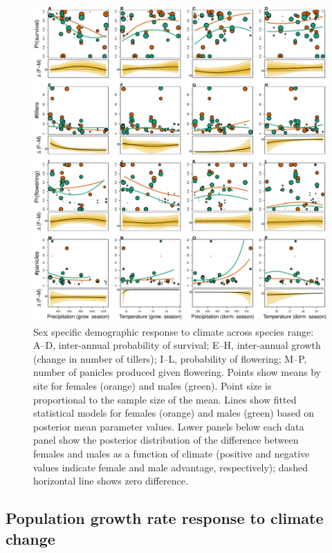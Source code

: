 \documentclass[11pt]{article}
\begin{document}
\begin{figure}%
  \begin{center}
    \includegraphics[width=0.95\linewidth]{Figures/vital_rates.pdf}
  \caption{Sex specific demographic response to climate across species range: A--D, inter-annual probability of survival; E--H, inter-annual growth (change in number of tillers); I--L, probability of flowering; M--P, number of panicles produced given flowering. 
  Points show means by site for females (orange) and males (green). 
  Point size is proportional to the sample size of the mean.
  Lines show fitted statistical models for females (orange) and males (green) based on posterior mean parameter values.
  Lower panels below each data panel show the posterior distribution of the difference between females and males as a function of climate (positive and negative values indicate female and male advantage, respectively); dashed horizontal line shows zero difference.}
  \label{fig:vital_rates}
  \end{center}
\end{figure}

\subsection*{Population growth rate response to climate change}
\end{document}
